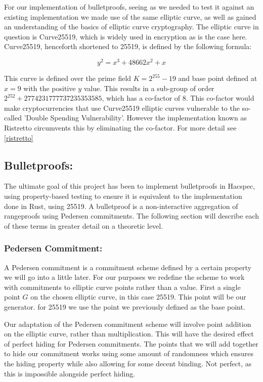 \documentclass{article}
\begin{document}
For our implementation of bulletproofs, seeing as we needed to test it
against an existing implementation we made use of the same elliptic
curve, as well as gained an understanding of the basics of elliptic
curve cryptography. The elliptic curve in question is Curve25519, which
is widely used in encryption as is the case here. Curve25519, henceforth
shortened to 25519, is defined by the following formula:

$$y^2 = x^3 + 48662x^2 + x$$

This curve is defined over the prime field $K = 2^{255} - 19$ and base
point defined at $x = 9$ with the positive $y$ value. This results in a
sub-group of order $2^{252} + 2774231777737235353585$, which has a
co-factor of $8$. This co-factor would make cryptocurrencies that use
Curve25519 elliptic curves vulnerable to the so-called 'Double Spending
Vulnerability'. However the implementation known as Ristretto circumvents
this by eliminating the co-factor. For more detail see \ref{ristretto}

\subsection{Bulletproofs:}\label{Bulletproofs}

The ultimate goal of this project has been to implement bulletproofs in
Hacspec, using property-based testing to ensure it is equivalent to the
implementation done in Rust, using 25519. A bulletproof is a
non-interactive aggregation of rangeproofs using Pedersen commitments.
The following section will describe each of these terms in greater detail
on a theoretic level.

\subsubsection{Pedersen Commitment:}

A Pedersen commitment is a commitment scheme defined by a certain
property we will go into a little later. For our purposes we redefine
the scheme to work with commitments to elliptic curve points rather than
a value. First a single point $G$ on the chosen elliptic curve, in this
case 25519. This point will be our generator. for 25519 we use the point
we previously defined as the base point. 

Our adaptation of the Pedersen commitment scheme will involve point
addition on the elliptic curve, rather than multiplication. This will
have the desired effect of perfect hiding for Pedersen commitments. The
points that we will add together to hide our commitment works using some
amount of randomness which ensures the hiding property while also
allowing for some decent binding. Not perfect, as this is impossible
alongside perfect hiding. 
\end{document}
